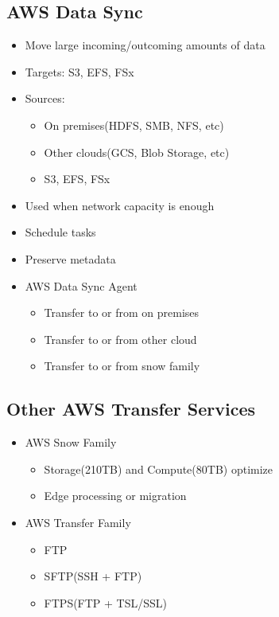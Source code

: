 \documentclass[../../main.tex]{subfiles}
\begin{document}
\subsection{AWS Data Sync}
\begin{itemize}
    \item Move large incoming/outcoming amounts of data
    \item Targets: S3, EFS, FSx
    \item Sources:
    \begin{itemize}
        \item On premises(HDFS, SMB, NFS, etc)
        \item Other clouds(GCS, Blob Storage, etc)
        \item S3, EFS, FSx
    \end{itemize}
    \item Used when network capacity is enough
    \item Schedule tasks
    \item Preserve metadata
    \item AWS Data Sync Agent
    \begin{itemize}
        \item Transfer to or from on premises
        \item Transfer to or from other cloud
        \item Transfer to or from snow family
    \end{itemize}
\end{itemize}

\subsection{Other AWS Transfer Services}
\begin{itemize}
    \item AWS Snow Family
    \begin{itemize}
        \item Storage(210TB) and Compute(80TB) optimize
        \item Edge processing or migration
    \end{itemize}
    \item AWS Transfer Family
    \begin{itemize}
        \item FTP
        \item SFTP(SSH + FTP)
        \item FTPS(FTP + TSL/SSL)
    \end{itemize}
\end{itemize}
\end{document}
